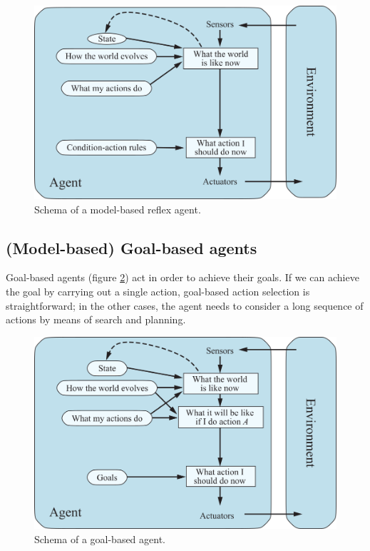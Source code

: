 \begin{figure}[hbtp]
    \centering
    \includegraphics{Images/Chapter 1/model-based-reflex-agent.png}
    \caption{Schema of a model-based reflex agent.}
    \label{fig:ch1-modelbasedreflexagent}
\end{figure}

\subsection{(Model-based) Goal-based agents}
Goal-based agents (figure \ref{fig:ch1-goalbasedagent}) act in order to achieve their goals. If we can achieve the goal by carrying out a single action, goal-based action selection is straightforward; in the other cases, the agent needs to consider a long sequence of actions by means of search and planning.

\begin{figure}[hbtp]
    \centering
    \includegraphics{Images/Chapter 1/goal-based-agent.png}
    \caption{Schema of a goal-based agent.}
    \label{fig:ch1-goalbasedagent}
\end{figure}

